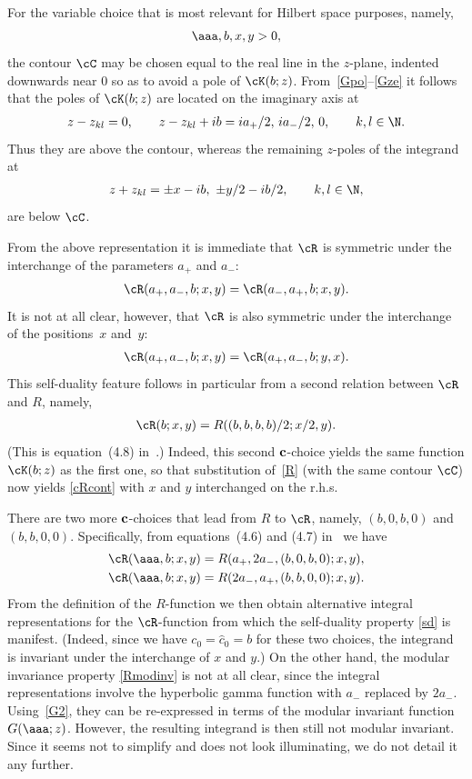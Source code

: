 For the variable choice that is most relevant for Hilbert space purposes, namely,
\begin{gather}\label{Hpar}
\aaa,b,x,y>0,
\end{gather}
the contour $\cC$ may be chosen equal to the real line in the $z$-plane, indented downwards near 0 so as to avoid a pole of $\cK(b;z)$. From~\eqref{Gpo}--\eqref{Gze} it follows that the poles of $\cK(b;z)$ are located on the imaginary axis at
\begin{gather}\label{Kpoles}
z-z_{kl}=0,\qquad z-z_{kl}+ib=ia_{+}/2, \, ia_{-}/2, \, 0,\qquad k,l\in\N.
\end{gather}
Thus they are above the contour, whereas the remaining $z$-poles of the integrand at
\begin{gather}
z+z_{kl}=\pm x-ib,\  \pm y/2-ib/2,\qquad  k,l\in\N,
\end{gather}
are below $\cC$.

From the above representation it is immediate that $\cR$ is symmetric under the interchange of the parameters $a_{+}$ and $a_{-}$:
\begin{gather}\label{Rmodinv}
\cR(a_{+},a_{-},b;x,y)=\cR(a_{-},a_{+},b;x,y).
\end{gather}
It is not at all clear, however, that $\cR$ is also symmetric under the interchange of the positions~$x$ and~$y$:
\begin{gather}\label{sd}
\cR(a_{+},a_{-},b;x,y)=\cR(a_{+},a_{-},b;y,x).
\end{gather}
 This self-duality feature follows in particular from a second relation between $\cR$ and $R$, namely,
\begin{gather}\label{cR2}
\cR(b;x,y)=R((b,b,b,b)/2;x/2,y).
\end{gather}
(This is equation~(4.8) in~\cite{quad}.) Indeed, this second ${\bf c}$-choice yields the same function $\cK(b;z)$ as the f\/irst one, so that substitution of~\eqref{R} (with the same contour $\cC$) now yields \eqref{cRcont} with $x$ and $y$ interchanged on the r.h.s.

There are two more ${\bf c}$-choices that lead from $R$ to $\cR$, namely, $(b,0,b,0)$ and $(b,b,0,0)$. Specif\/ically, from equations~(4.6) and (4.7) in~\cite{quad} we have
\begin{gather}\label{cR3}
\cR(\aaa,b;x,y)=R(a_{+},2a_{-},(b,0,b,0);x,y),
\\
\label{cR4}
\cR(\aaa,b;x,y)=R(2a_{-},a_{+},(b,b,0,0);x,y).
\end{gather}
From the def\/inition of the $R$-function we then obtain alternative integral representations for the $\cR$-function from which the self-duality property \eqref{sd} is manifest. (Indeed, since we have $c_0=\hat{c}_0=b$ for these two choices, the integrand is invariant under the interchange of $x$ and $y$.) On the other hand, the modular invariance property \eqref{Rmodinv} is not at all clear, since the integral representations involve the hyperbolic gamma function
 with $a_{-}$ replaced by $2a_{-}$. Using~\eqref{G2},
 they can be re-expressed in terms of the modular invariant function $G(\aaa;z)$. However, the resulting integrand is then still not modular invariant. Since it seems not to simplify and does not look
illuminating, we do not detail it any further.

